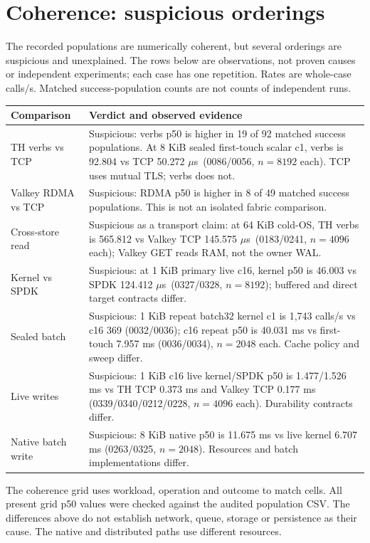\documentclass[10pt,a4paper]{article}
\newcommand{\us}{$\mu$s}
\begin{document}
\section{Coherence: suspicious orderings}
The recorded populations are numerically coherent, but several orderings are suspicious and unexplained. The rows below are observations, not proven causes or independent experiments; each case has one repetition. Rates are whole-case calls/s. Matched success-population counts are not counts of independent runs.
\begin{center}\small
\begin{tabular}{p{.25\linewidth}p{.66\linewidth}}\toprule
Comparison & Verdict and observed evidence\\\midrule
TH verbs vs TCP & Suspicious: verbs p50 is higher in 19 of 92 matched success populations. At 8 KiB sealed first-touch scalar c1, verbs is 92.804 vs TCP 50.272 \us\ (0086/0056, $n=8192$ each). TCP uses mutual TLS; verbs does not.\\
Valkey RDMA vs TCP & Suspicious: RDMA p50 is higher in 8 of 49 matched success populations. This is not an isolated fabric comparison.\\
Cross-store read & Suspicious as a transport claim: at 64 KiB cold-OS, TH verbs is 565.812 vs Valkey TCP 145.575 \us\ (0183/0241, $n=4096$ each); Valkey GET reads RAM, not the owner WAL.\\
Kernel vs SPDK & Suspicious: at 1 KiB primary live c16, kernel p50 is 46.003 vs SPDK 124.412 \us\ (0327/0328, $n=8192$); buffered and direct target contracts differ.\\
Sealed batch & Suspicious: 1 KiB repeat batch32 kernel c1 is 1,743 calls/s vs c16 369 (0032/0036); c16 repeat p50 is 40.031 ms vs first-touch 7.957 ms (0036/0034), $n=2048$ each. Cache policy and sweep differ.\\
Live writes & Suspicious: 1 KiB c16 live kernel/SPDK p50 is 1.477/1.526 ms vs TH TCP 0.373 ms and Valkey TCP 0.177 ms (0339/0340/0212/0228, $n=4096$ each). Durability contracts differ.\\
Native batch write & Suspicious: 8 KiB native p50 is 11.675 ms vs live kernel 6.707 ms (0263/0325, $n=2048$). Resources and batch implementations differ.\\\bottomrule
\end{tabular}
\end{center}
The coherence grid uses workload, operation and outcome to match cells. All present grid p50 values were checked against the audited population CSV. The differences above do not establish network, queue, storage or persistence as their cause. The native and distributed paths use different resources.
\end{document}
